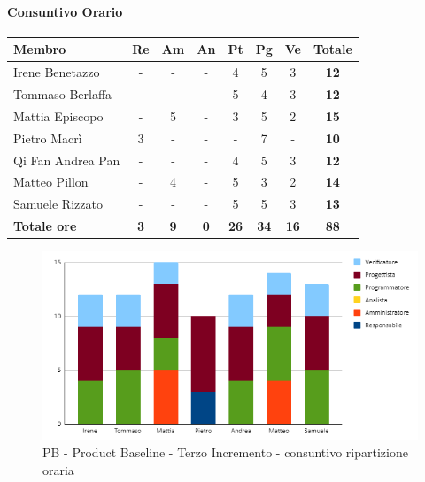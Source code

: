 \paragraph{Consuntivo Orario}
\begin{center}
	\renewcommand{\arraystretch}{1.8} %
	\begin{tabular}{ |m{8em}|c|c|c|c|c|c|c| }
	\hline
	\textbf{Membro} & \textbf{Re} & \textbf{Am} &  \textbf{An} &  \textbf{Pt} &  \textbf{Pg} &  \textbf{Ve} &  \textbf{Totale}\\
    \hline
    Irene Benetazzo   & - & - & - & 4 & 5 & 3 & \textbf{12} \\
    \hline
    Tommaso Berlaffa  & - & - & - & 5 & 4 & 3 & \textbf{12} \\
    \hline
    Mattia Episcopo   & - & 5 & - & 3 & 5 & 2 & \textbf{15} \\
    \hline
    Pietro Macrì      & 3 & - & - & - & 7 & - & \textbf{10} \\
    \hline
    Qi Fan Andrea Pan & - & - & - & 4 & 5 & 3 & \textbf{12} \\
    \hline
    Matteo Pillon     & - & 4 & - & 5 & 3 & 2 & \textbf{14} \\
    \hline
    Samuele Rizzato   & - & - & - & 5 & 5 & 3 & \textbf{13} \\
    \hline
    \textbf{Totale ore} & \textbf{3} & \textbf{9} & \textbf{0} & \textbf{26} & \textbf{34} & \textbf{16} & \textbf{88} \\
    \hline
	\end{tabular}
\end{center}
\begin{figure}[H]
    \centering\includegraphics[width=\textwidth, height=\textheight,keepaspectratio]{images/consuntivo/consuntivo-PB-ore-terzo-incremento.png}
    \caption{PB - Product Baseline - Terzo Incremento - consuntivo ripartizione oraria}
\end{figure}

